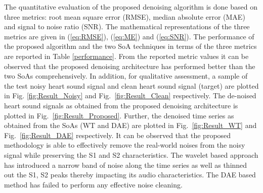 \documentclass[sigconf,screen]{acmart}
\begin{document}

The quantitative evaluation of the proposed denoising algorithm is done based on three metrics: root mean square error (RMSE), median absolute error (MAE) and signal to noise ratio (SNR). The mathematical representations of the three metrics are given in (\ref{eq:RMSE}), (\ref{eq:ME}) and (\ref{eq:SNR}). 
The performance of the proposed algorithm and the two SoA techniques in terms of the three metrics are reported in Table \ref{performance}. From the reported metric values it can be observed that the proposed denoising architecture has performed better than the two SoAs comprehensively. 
In addition, for qualitative assessment, a sample of the test noisy heart sound signal  and clean heart sound signal (target) are plotted in Fig. \ref{fig:Result_Noisy} and Fig.~\ref{fig:Result_Clean} respectively. The de-noised heart sound signals as obtained from the proposed denoising architecture is plotted in Fig.~\ref{fig:Result_Proposed}. Further, the denoised time series as obtained from the SoAs (WT and DAE) are plotted in Fig.~\ref{fig:Result_WT} and Fig.~\ref{fig:Result_DAE} respectively. It can be observed that the proposed methodology is able to effectively remove the real-world noises from the noisy signal while preserving the S1 and S2 characteristics. The wavelet based approach has introduced a narrow band of noise along the time series as well as thinned out the S1, S2 peaks thereby impacting its audio characteristics. The DAE based method has failed to perform any effective noise cleaning. 
\end{document}
